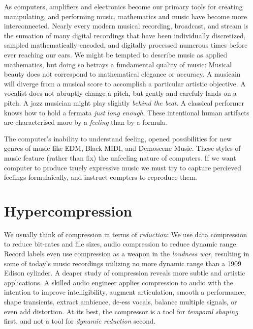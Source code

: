 \documentclass{tufte-book}
\begin{document}
As computers, amplifiers and electronics become our primary tools for
creating manipulating, and performing music, mathematics and music
have become more interconnected. Nearly every modern musical
recording, broadcast, and stream is the sumation of many digital
recordings that have been individually discretized, sampled
mathematically encoded, and digitally processed numerous times before
ever reaching our ears. We might be tempted to describe music as
applied mathematics, but doing so betrays a fundamental quality of
music: Musical beauty does not correspond to mathematical elegance or
accuracy. A musicain will diverge from a musical score to accomplish a
particular artistic objective. A vocalist does not abruptly change a
pitch, but gently and carefuly lands on a pitch. A jazz musician might
play slightly \emph{behind the beat}. A classical performer knows how
to hold a fermata \emph{just long enough}. These intentional human
artifacts are characterised more by a \emph{feeling} than by a
formula.

The computer's inability to understand feeling, opened possibilities
for new genres of music like EDM, Black MIDI, and Demoscene
Music. These styles of
music feature (rather than fix) the unfeeling nature of computers. If
we want computer to produce truely expressive music we must try to
capture percieved feelings formulaically, and instruct compters to
reproduce them.


\section{Hypercompression}
\label{sec:hypercompression-intro}
We usually think of compression in terms of \emph{reduction}: We use
data compression to reduce bit-rates and file sizes, audio compression
to reduce dynamic range. Record labels even use compression as a
weapon in the \emph{loudness war}\cite{Deruty2014a}, resulting in some
of today's music recordings utilizing no more dynamic range than a
1909 Edison cylinder.\cite{Katz2007} A deaper study of compression
reveals more subtle and artistic applications. A skilled audio
engineer applies compression to audio with the intention to improve
intelligibility, augment articulation, smooth a performance, shape
transients, extract ambience, de-ess vocals, balance multiple signals,
or even add distortion.\cite{Case2007} At its best, the compressor is
a tool for \emph{temporal shaping} first, and not a tool for \emph{dynamic
  reduction} second.
\end{document}
